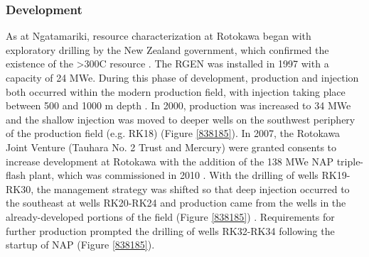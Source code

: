 \subsubsection{Development}
As at Ngatamariki, resource characterization at Rotokawa began with exploratory drilling by the New Zealand government, which confirmed the existence of the \textgreater300\textdegree C resource \citep{Sewell_2015,McNamara_2016}. The \acrfull{RGEN} was installed in 1997 with a capacity of 24 \acrshort{MWe}. During this phase of development, production and injection both occurred within the modern production field, with injection taking place between 500 and 1000 m depth \citep{Sewell_2015}. In 2000, production was increased to 34 \acrshort{MWe} and the shallow injection was moved to deeper wells on the southwest periphery of the production field (e.g. RK18) (Figure \ref{838185}). In 2007, the Rotokawa Joint Venture (Tauhara No. 2 Trust and Mercury) were granted consents to increase development at Rotokawa with the addition of the 138 \acrshort{MWe} \acrfull{NAP} triple-flash plant, which was commissioned in 2010 \citep{Sewell_2015}. With the drilling of wells RK19-RK30, the management strategy was shifted so that deep injection occurred to the southeast at wells RK20-RK24 and production came from the wells in the already-developed portions of the field (Figure \ref{838185}) \citep{Sewell_2015,McNamara_2016}. Requirements for further production prompted the drilling of wells RK32-RK34 following the startup of \acrshort{NAP} (Figure \ref{838185}).

